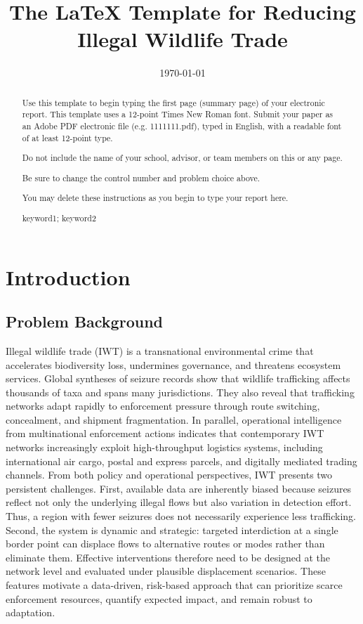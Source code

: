 \documentclass{mcmthesis}
\title{The \LaTeX{} Template for Reducing Illegal Wildlife Trade \\ \large \MCMversion}
\date{\today}
\begin{document}
\begin{abstract}
\par Use this template to begin typing the first page (summary page) of your electronic report. This
template uses a 12-point Times New Roman font. Submit your paper as an Adobe PDF
electronic file (e.g. 1111111.pdf), typed in English, with a readable font of at least 12-point type. 

Do not include the name of your school, advisor, or team members on this or any page. 

Be sure to change the control number and problem choice above. 

You may delete these instructions as you begin to type your report here.  

\begin{keywords}
keyword1; keyword2
\end{keywords}
\end{abstract}
\maketitle

\tableofcontents
\newpage

\section{Introduction}
\subsection{Problem Background}
Illegal wildlife trade (IWT) is a transnational environmental crime that accelerates biodiversity loss, undermines governance, and threatens ecosystem services. Global syntheses of seizure records show that wildlife trafficking affects thousands of taxa and spans many jurisdictions. They also reveal that trafficking networks adapt rapidly to enforcement pressure through route switching, concealment, and shipment fragmentation. In parallel, operational intelligence from multinational enforcement actions indicates that contemporary IWT networks increasingly exploit high-throughput logistics systems, including international air cargo, postal and express parcels, and digitally mediated trading channels.
From both policy and operational perspectives, IWT presents two persistent challenges. First, available data are inherently biased because seizures reflect not only the underlying illegal flows but also variation in detection effort. Thus, a region with fewer seizures does not necessarily experience less trafficking. Second, the system is dynamic and strategic: targeted interdiction at a single border point can displace flows to alternative routes or modes rather than eliminate them. Effective interventions therefore need to be designed at the network level and evaluated under plausible displacement scenarios. These features motivate a data-driven, risk-based approach that can prioritize scarce enforcement resources, quantify expected impact, and remain robust to adaptation.
\end{document}
